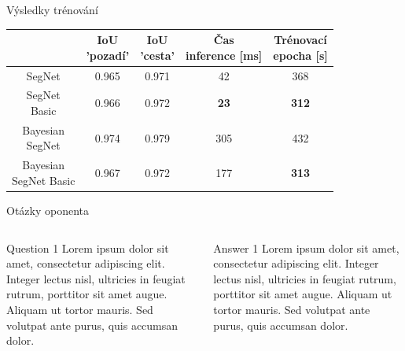 \documentclass[aspectratio=1610]{beamer}
\begin{document}
\begin{frame}{Výsledky trénování}
\renewcommand{\arraystretch}{1.5}
\begin{table}[h]
	\centering	
	\begin{tabular}{|c|c|c|c|c|}
		\hline
		\thead{Architektura} & \thead{IoU \\ 'pozadí'} & \thead{IoU \\ 'cesta'} & \thead{Čas \\ inference [ms] } & \thead{Trénovací \\ epocha [s] }\\		
		\hline	
		SegNet & 0.965 & 0.971 & 42 & 368 \\	
		\hline	
		\makecell{SegNet \\ Basic} & 0.966 & 0.972 & \textbf{23} & \textbf{312} \\	
		\hline	
		\makecell{Bayesian \\ SegNet} & 0.974 & 0.979 & 305 & 432 \\	
		\hline	
		\makecell{Bayesian \\ SegNet Basic} & 0.967 & 0.972 & 177 & \textbf{313} \\
		\hline
	\end{tabular}
\end{table}
\end{frame}
\begin{frame}{Otázky oponenta}
\begin{columns}
\begin{exampleblock}{Question 1}
Lorem ipsum dolor sit amet, consectetur adipiscing elit. Integer lectus nisl, ultricies in feugiat rutrum, porttitor sit amet augue. Aliquam ut tortor mauris. Sed volutpat ante purus, quis accumsan dolor.
\end{exampleblock}

\begin{block}{Answer 1}
Lorem ipsum dolor sit amet, consectetur adipiscing elit. Integer lectus nisl, ultricies in feugiat rutrum, porttitor sit amet augue. Aliquam ut tortor mauris. Sed volutpat ante purus, quis accumsan dolor.
\end{block}
\end{columns}
\end{frame}

\end{document}

